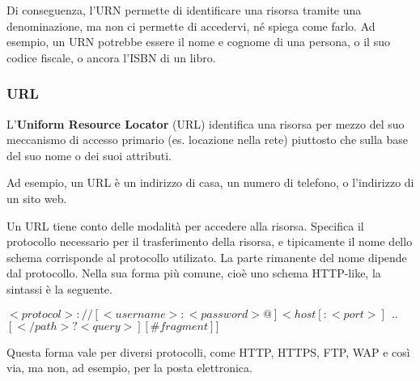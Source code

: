             \vspace{3mm}
            
            Di conseguenza, l'URN permette di identificare una risorsa tramite una denominazione, ma non ci permette di accedervi, né spiega come farlo. Ad esempio, un URN potrebbe essere il nome e cognome di una persona, o il suo codice fiscale, o ancora l'ISBN di un libro.
            
        \subsubsection{URL}
            
            L'\textbf{Uniform Resource Locator} (URL) identifica una risorsa per mezzo del suo meccanismo di accesso primario (es. locazione nella rete) piuttosto che sulla base del suo nome o dei suoi attributi.
            
            Ad esempio, un URL è un indirizzo di casa, un numero di telefono, o l'indirizzo di un sito web.
            
            \vspace{3mm}
            
            Un URL tiene conto delle modalità per accedere alla risorsa. Specifica il protocollo necessario per il trasferimento della risorsa, e tipicamente il nome dello schema corrisponde al protocollo utilizato. La parte rimanente del nome dipende dal protocollo. Nella sua forma più comune, cioè uno schema HTTP-like, la sintassi è la seguente.
            
            \begin{center}
                \(<protocol>://[<username>:<password>@]<host[:<port>]\ \ ..\)
                \([</path>?<query>][\#fragment]]\)
            \end{center}
            
            Questa forma vale per diversi protocolli, come HTTP, HTTPS, FTP, WAP e così via, ma non, ad esempio, per la posta elettronica.
            
